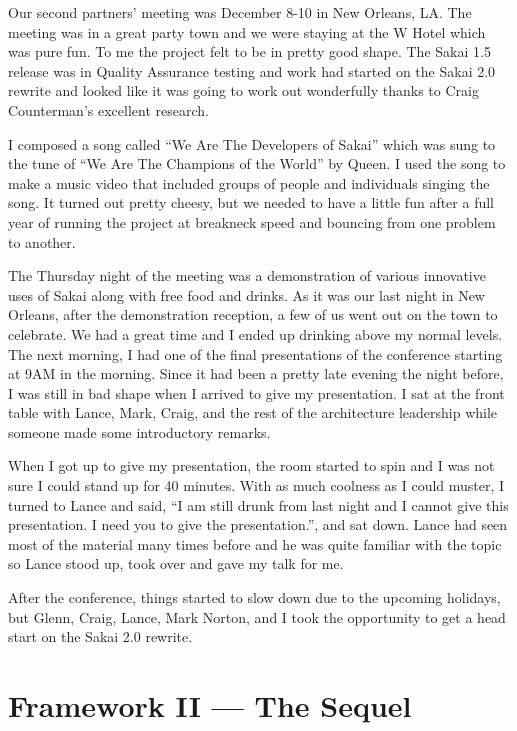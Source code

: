 \documentclass[12pt]{book}
\begin{document}
Our second partners' meeting was December
8-10 in New Orleans, LA.  The meeting was
in a great party town and we were staying
at the W Hotel which was pure fun.  To
me the project felt to be in pretty
good shape.   The Sakai 1.5 release was in
Quality Assurance testing and work had started
on the Sakai 2.0 rewrite and looked like
it was going to work out wonderfully thanks
to Craig Counterman's excellent research.

I composed a song called ``We Are The
Developers of Sakai'' which was sung to the
tune of ``We Are The Champions of the World''
by Queen.  I used the song to make a music video
that included groups of people and individuals
singing the song.  It turned out pretty
cheesy, but we needed to have a little fun
after a full year of running the project at
breakneck speed and bouncing from one problem
to another.


The Thursday night of the meeting was a
demonstration of various innovative uses of Sakai
along with free food and drinks.  As it
was our last night in New Orleans, after the
demonstration reception, a few of us went
out on the town to celebrate.  We had a great time
and I ended up drinking above my normal levels.
The next morning, I had one of the
final presentations of the conference starting
at 9AM in the morning.  Since it had been a
pretty late evening the night before, I was
still in bad shape when I arrived to give
my presentation.  I sat at the front table
with Lance, Mark, Craig, and the rest of the
architecture leadership while someone made
some introductory remarks.

When I got up to give my presentation, the room
started to spin and I was not sure I could
stand up for 40 minutes.  With as much coolness
as I could muster, I turned to Lance and
said, ``I am still drunk from last night
and I cannot give this presentation.  I need
you to give the presentation.'', and sat down.
Lance had seen most of the material many times
before and he was quite familiar with the topic
so Lance stood up, took over and gave my
talk for me.

After the conference, things started to slow
down due to the upcoming holidays, but Glenn,
Craig, Lance, Mark Norton, and I took the
opportunity to get a head start on the Sakai
2.0 rewrite.

\chapter{Framework II --- The Sequel}
\end{document}

